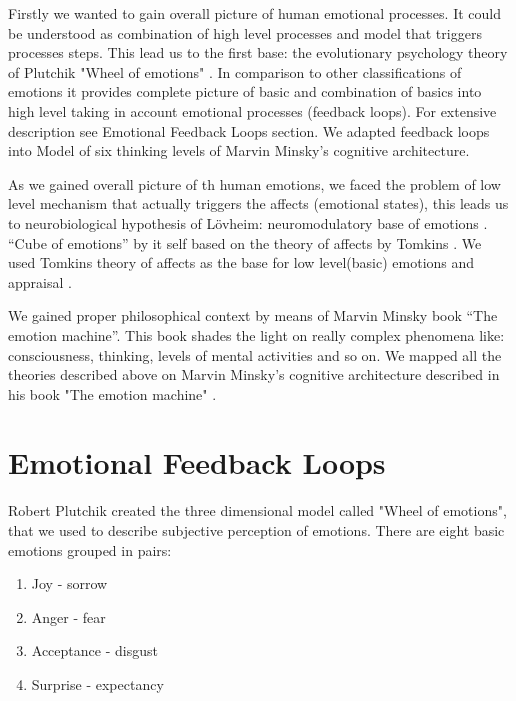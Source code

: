 Firstly we wanted to gain overall picture of human emotional processes. It could be understood as combination of high level processes and model that triggers processes steps. This lead us to the first base: the evolutionary psychology theory of Plutchik "Wheel of emotions" \cite{natureofemotions}. In comparison to other classifications of emotions it provides complete picture of basic and combination of basics into high level taking in account emotional processes (feedback loops). For extensive description see Emotional Feedback Loops section. We adapted feedback loops into Model of six \cite{emotionmachine} thinking levels of Marvin Minsky's cognitive architecture.

As we gained overall picture of th human emotions, we faced the problem of low level mechanism that actually triggers the affects (emotional states), this leads us to neurobiological hypothesis of L\"{o}vheim: neuromodulatory base of emotions \cite{cubeofemotions}. ``Cube of emotions'' by it self based on the theory of affects by Tomkins \cite{primer_affect_psychology, tomkins1, tomkins2, tomkins3}. We used Tomkins theory of affects as the base for low level(basic) emotions and appraisal \cite{primer_affect_psychology, appraisal_considered_as_a_process, appraisal_determinants_of_emotions, putting_appraisal_in_context}.

We gained proper philosophical context by means of Marvin Minsky book ``The emotion machine''. This book shades the light on really complex phenomena like: consciousness, thinking, levels of mental activities and so on. We mapped all the theories described above on Marvin Minsky's cognitive architecture described in his book "The emotion machine" \cite{emotionmachine}.

\section{Emotional Feedback Loops}

Robert Plutchik created the three dimensional model \cite{natureofemotions} called "Wheel of emotions", that we used to describe subjective perception of emotions. There are eight basic emotions grouped in pairs:

\begin{enumerate}
 \item  Joy - sorrow
 \item  Anger - fear
 \item  Acceptance - disgust
 \item  Surprise - expectancy
\end{enumerate}

